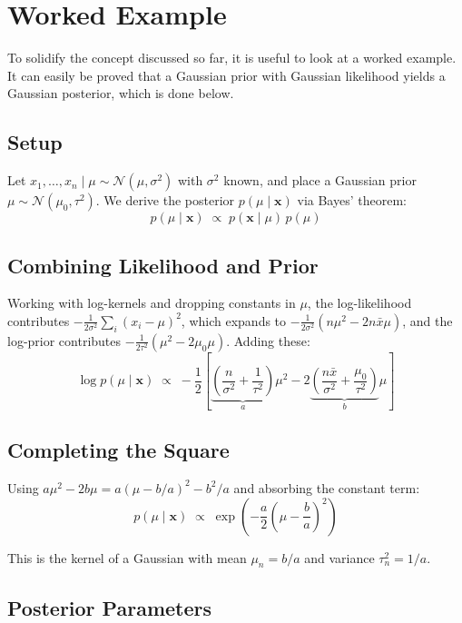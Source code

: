 \documentclass[11pt]{article}
\begin{document}
\section{Worked Example}

To solidify the concept discussed so far, it is useful to look at a worked example. It can easily be proved that a Gaussian prior with Gaussian likelihood yields a Gaussian posterior, which is done below.

\subsection*{Setup}

Let $x_1, \ldots, x_n \mid \mu \sim \mathcal{N}(\mu, \sigma^2)$ with $\sigma^2$ known, and place a Gaussian prior $\mu \sim \mathcal{N}(\mu_0, \tau^2)$. We derive the posterior $p(\mu \mid \mathbf{x})$ via Bayes' theorem:
\[
  p(\mu \mid \mathbf{x}) \;\propto\; p(\mathbf{x} \mid \mu)\,p(\mu)
\]

\subsection*{Combining Likelihood and Prior}

Working with log-kernels and dropping constants in $\mu$, the log-likelihood contributes $-\frac{1}{2\sigma^2}\sum_i(x_i - \mu)^2$, which expands to $-\frac{1}{2\sigma^2}(n\mu^2 - 2n\bar{x}\mu)$, and the log-prior contributes $-\frac{1}{2\tau^2}(\mu^2 - 2\mu_0\mu)$. Adding these:
\[
  \log p(\mu \mid \mathbf{x}) \;\propto\; -\frac{1}{2}\left[
    \underbrace{\left(\frac{n}{\sigma^2} + \frac{1}{\tau^2}\right)}_{a}\mu^2
    - 2\underbrace{\left(\frac{n\bar{x}}{\sigma^2} + \frac{\mu_0}{\tau^2}\right)}_{b}\mu
  \right]
\]

\subsection*{Completing the Square}

Using $a\mu^2 - 2b\mu = a(\mu - b/a)^2 - b^2/a$ and absorbing the constant term:
\[
  p(\mu \mid \mathbf{x}) \;\propto\; \exp\!\left(-\frac{a}{2}\!\left(\mu - \frac{b}{a}\right)^{\!2}\right)
\]

This is the kernel of a Gaussian with mean $\mu_n = b/a$ and variance $\tau_n^2 = 1/a$.

\subsection*{Posterior Parameters}
\end{document}
